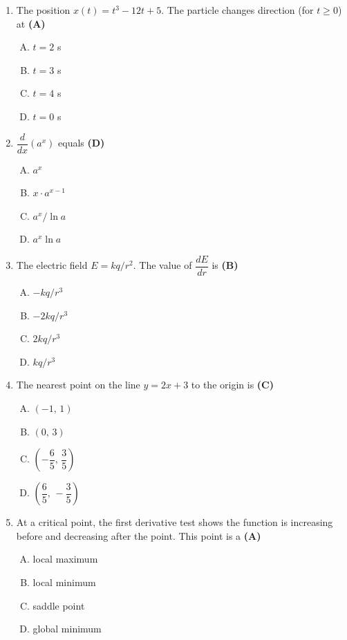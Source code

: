 \documentclass[10pt,a4paper]{article}
\begin{document}
\begin{enumerate}[1.]
\item The position $x(t) = t^3 - 12t + 5$. The particle changes direction (for $t \geq 0$) at \hfill \textbf{(A)}
\begin{enumerate}[(A)]
    \item $t = 2$ s
    \item $t = 3$ s
    \item $t = 4$ s
    \item $t = 0$ s
\end{enumerate}

\item $\dfrac{d}{dx}(a^x)$ equals \hfill \textbf{(D)}
\begin{enumerate}[(A)]
    \item $a^x$
    \item $x \cdot a^{x-1}$
    \item $a^x / \ln a$
    \item $a^x \ln a$
\end{enumerate}

\item The electric field $E = kq/r^2$. The value of $\dfrac{dE}{dr}$ is \hfill \textbf{(B)}
\begin{enumerate}[(A)]
    \item $-kq/r^3$
    \item $-2kq/r^3$
    \item $2kq/r^3$
    \item $kq/r^3$
\end{enumerate}

\item The nearest point on the line $y = 2x + 3$ to the origin is \hfill \textbf{(C)}
\begin{enumerate}[(A)]
    \item $(-1,\,1)$
    \item $(0,\,3)$
    \item $\left(-\dfrac{6}{5},\,\dfrac{3}{5}\right)$
    \item $\left(\dfrac{6}{5},\,-\dfrac{3}{5}\right)$
\end{enumerate}

\item At a critical point, the first derivative test shows the function is increasing before and decreasing after the point. This point is a \hfill \textbf{(A)}
\begin{enumerate}[(A)]
    \item local maximum
    \item local minimum
    \item saddle point
    \item global minimum
\end{enumerate}


\end{enumerate}
\end{document}
